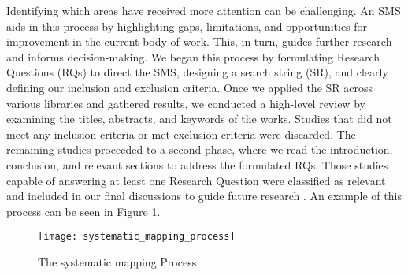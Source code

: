 Identifying which areas have received more attention can be challenging. An SMS aids in this process by highlighting gaps, limitations, and opportunities for improvement in the current body 
of work. This, in turn, guides further research and informs decision-making. We began this process by formulating Research Questions (RQs) to direct the SMS, designing a search string (SR), 
and clearly defining our inclusion and exclusion criteria.
Once we applied the SR across various libraries and gathered results, we conducted a high-level review by examining the titles, abstracts, and keywords of the works. Studies that did not meet 
any inclusion criteria or met exclusion criteria were discarded. The remaining studies proceeded to a second phase, where we read the introduction, conclusion, and relevant sections to address 
the formulated RQs. Those studies capable of answering at least one Research Question were classified as relevant and included in our final discussions to guide future research \cite{petersen2008systematic}.
An example of this process can be seen in Figure \ref{fig:systematic_mapping_process}.


\begin{figure}[h]
  \centering
  \texttt{[image: systematic\_mapping\_process]}
  \caption{The systematic mapping Process}
  \label{fig:systematic_mapping_process}
\end{figure}

